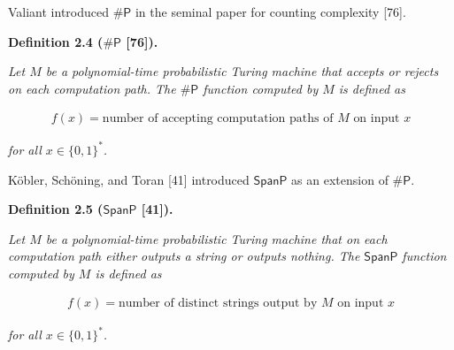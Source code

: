 \documentclass[10pt,a4paper]{article}
\begin{document}
Valiant introduced ${\mathsf{\#}\mathsf{P}}$ in the seminal paper for counting complexity [76].\par





\par\medskip\noindent\textbf{
\textbf{Definition 2.4}\textbf{ }(${\mathsf{\#}\mathsf{P}}$ [76])\textbf{.}
}\par



\emph{Let $M$ be a polynomial-time probabilistic Turing machine that accepts or rejects on each computation path. The ${\mathsf{\#}\mathsf{P}}$ function computed by $M$ is defined as}\par


\[\begin{gathered}
f(x)=\textrm{number of accepting computation paths of $M$ on input $x$}
\end{gathered}\]


\emph{for all $x\in\{0,1\}^{*}$.}\par






Köbler, Schöning, and Toran [41] introduced
$\mathsf{SpanP}$ as an extension of ${\mathsf{\#}\mathsf{P}}$.\par





\par\medskip\noindent\textbf{
\textbf{Definition 2.5}\textbf{ }($\mathsf{SpanP}$ [41])\textbf{.}
}\par



\emph{Let $M$ be a polynomial-time probabilistic
Turing machine that on each computation path either outputs a string
or outputs nothing. The $\mathsf{SpanP}$ function computed by $M$ is
defined as}\par


\[\begin{gathered}
f(x)=\textrm{number of distinct strings output by $M$ on
input $x$}
\end{gathered}\]


\emph{for all $x\in\{0,1\}^{*}$.}\par



\end{document}

